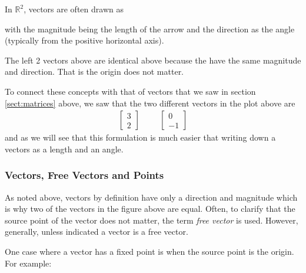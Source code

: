 In $\mathbb{R}^2$, vectors are often drawn as 
%
\begin{center}
\end{center}
with the magnitude being the length of the arrow and the direction as the angle (typically from the positive horizontal axis).  

The left 2 vectors above are identical above because the have the same magnitude and direction.  That is the origin does not matter.  

To connect these concepts with that of vectors that we saw in section \ref{sect:matrices}  above, we saw that the two different vectors in the plot above are
%
\begin{align*}
\begin{bmatrix}
3 \\ 2
\end{bmatrix} &&& \begin{bmatrix}
0 \\ -1
\end{bmatrix}
\end{align*}
and as we will see that this formulation is much easier that writing down a vectors as a length and an angle.  

\subsubsection{Vectors, Free Vectors and Points}

As noted above, vectors by definition have only a direction and magnitude which is why two of the vectors in the figure above are equal.  Often, to clarify that the source point of the vector does not matter, the term \emph{free vector} is used.   However, generally, unless indicated a vector is a free vector.  

One case where a vector has a fixed point is when the source point is the origin.  For example:

\begin{center}
\end{center}

